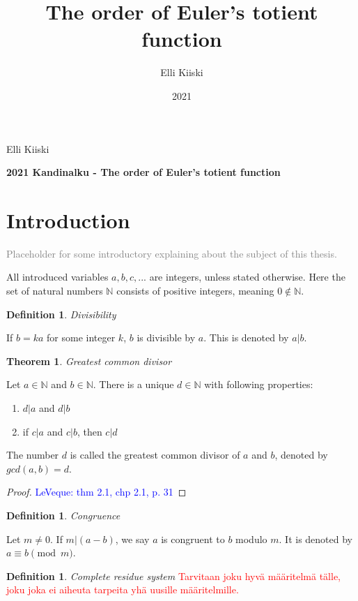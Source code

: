 \documentclass{article}
\title{The order of Euler's totient function}
\author{Elli Kiiski}
\date{2021}
\theoremstyle{definition}
\newtheorem{definition}[subsection]{Definition}
\newtheorem{theorem}[subsection]{Theorem}
\begin{document}
{\large
Elli Kiiski
\par
\textbf{2021 Kandinalku - The order of Euler's totient function}
}
\vspace{0.5cm}

\section{Introduction}

\textcolor{gray}{Placeholder for some introductory explaining about the subject of this thesis.}

All introduced variables $a, b, c, ...$ are integers, unless stated otherwise. Here the set of natural numbers $\mathbb{N}$ consists of positive integers, meaning $0 \not\in \mathbb{N}$.

\begin{definition}{\emph{Divisibility}}

If $b=ka$ for some integer $k$, $b$ is divisible by $a$. This is denoted by $a \vert b$.

\end{definition}

\begin{theorem}{\emph{Greatest common divisor}}

Let $a \in \mathbb{N}$ and $b \in \mathbb{N}$. There is a unique $d \in \mathbb{N}$ with following properties:

\begin{enumerate}
 \item $d \vert a$ and $d \vert b$
 \item if $c \vert a$ and $c \vert b$, then $c \vert d$
\end{enumerate}

The number $d$ is called the greatest common divisor of $a$ and $b$, denoted by $gcd(a,b) = d$.

\begin{proof}
\textcolor{blue}{LeVeque: thm 2.1, chp 2.1, p. 31}
\end{proof}
\end{theorem}

\begin{definition}\emph{Congruence}

Let $m\not=0$. If $m\vert(a-b)$, we say $a$ is congruent to $b$ modulo $m$. It is denoted by $a\equiv b \pmod{m}$.
\end{definition}

\begin{definition}\emph{Complete residue system}
\textcolor{red}{Tarvitaan joku hyvä määritelmä tälle, joku joka ei aiheuta tarpeita yhä uusille määritelmille.}
\end{definition}
\end{document}
